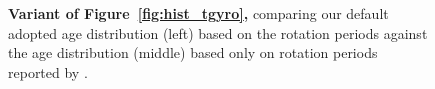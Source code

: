 \documentclass[11pt,twocolumn,tighten]{aastex63}
\begin{document}
\begin{figure}[!th]
  \begin{center}
    \leavevmode

	\vspace{-0.35cm}
  \end{center}
  \vspace{-0.66cm}
  \caption{{\bf Variant of Figure~\ref{fig:hist_tgyro},} comparing
  our default adopted age distribution (left) based on the \citet{Santos_2019,Santos_2021}
  rotation periods against the age distribution (middle) based only on rotation periods
  reported by \citet{McQuillan_2014}.
  \label{fig:hist_tgyro_mcq}
  }
\end{figure}



\clearpage
\listofchanges
\end{document}
